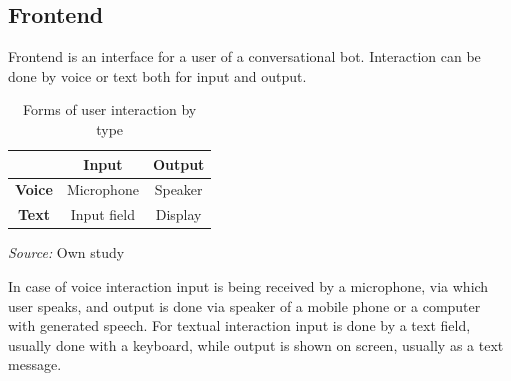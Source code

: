 \subsection{Frontend}

Frontend is an interface for a user of a conversational bot.
Interaction can be done by voice or text both for input and output.

\begin{table}
    \centering
    \begin{tabular}{|c|c|c|}
        \hline
        & \textbf{Input} & \textbf{Output} \\
        \hline
        \textbf{Voice} & Microphone & Speaker \\
        \hline
        \textbf{Text} & Input field & Display \\
        \hline
    \end{tabular}
    \caption{Forms of user interaction by type}
    \medskip
    \footnotesize\textit{Source:} Own study
\end{table}

In case of voice interaction input is being received by a microphone, via which user speaks, and output is done via speaker of a mobile phone or a computer with generated speech.
For textual interaction input is done by a text field, usually done with a keyboard, while output is shown on screen, usually as a text message.

